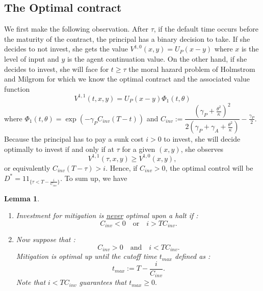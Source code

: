 \documentclass[numbook, envcountsect, envcountsame, envcountreset, runningheads, smallextended]{article}
\newtheorem{Lemma}{Lemma}[part]
\def \ind{1\!\!1}
\begin{document}
\subsection{The Optimal contract}

We first make the following observation. After $\tau$, if the default time occurs before the maturity of the contract, the principal has a binary decision to take. If she decides to not invest, she gets the value $V^{1,0}(x,y)=U_P(x-y)$ where $x$ 
is the level of input and $y$ is the agent continuation value.
On the other hand, if she decides to invest, she will face for $t \ge \tau$ the moral hazard problem of Holmstrom and Milgrom for which we know the optimal contract and the associated value function
$$
V^{1,1}(t,x,y)=U_P(x-y) \Phi_1(t, \theta) 
$$
where $\Phi_1(t, \theta) = \exp(-\gamma_P C_{inv}(T-t))$ and $C_{inv}:= \dfrac{\left(\gamma_P + \frac{\theta^2}{ \kappa}\right)^2}{2\left(\gamma_P + \gamma_A + \frac{\theta^2}{\kappa} \right)} - \frac{\gamma_P}{2}.$\\
Because the principal has to pay a sunk cost $i>0$ to invest, she will decide optimally to invest if and only if at  $\tau$ for a given $(x,y)$, she observes
$$
V^{1,1}(\tau,x,y) \ge V^{1,0}(x,y),
$$
or equivalently $C_{inv}(T-\tau) >i$. Hence, if $C_{inv}>0$, the optimal control will be $D^*=\ind_{\{\tau < T-\frac{i}{C_{inv}}\}}.$
To sum up, we have
\begin{Lemma}
\label{lemma:new1}
\begin{enumerate}
\item Investment for mitigation is \underline{never} optimal upon a halt if : 
$$ C_{inv} < 0 \quad \text{or} \quad i > T C_{inv}. $$
\item Now suppose that :
$$ C_{inv} > 0 \quad \text{and} \quad i < T C_{inv}. $$
Mitigation is optimal up until the cutoff time $t_{max}$ defined as : 
$$ t_{max} := T - \frac{i}{C_{inv}}. $$
Note that  $i < T C_{inv}$ guarantees that $t_{max} \geq 0.$
\end{enumerate}
\end{Lemma}
\end{document}
